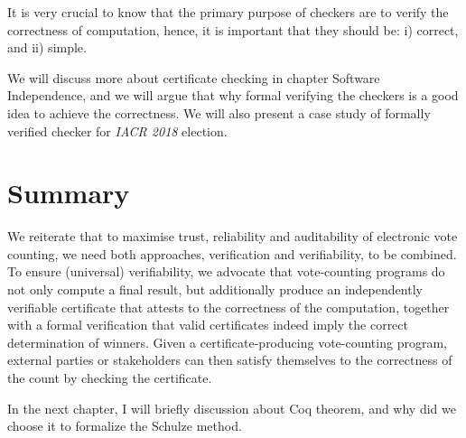    

  
  It is very crucial to know that the primary purpose of checkers are to verify the 
  correctness of computation, hence, it is important that they 
  should be: i) correct, and ii) simple.  
  
  We will discuss more about certificate checking 
  in chapter Software Independence,  and we will argue that why formal verifying the checkers is 
  a good idea to achieve the correctness.  We will also present a case study of 
  formally verified checker for \textit{IACR 2018} election.
  
  
    
   
\section{Summary}
We reiterate that to maximise trust, reliability and auditability of electronic vote counting, we
need both approaches, verification and verifiability, to be combined. To ensure
(universal) verifiability, we advocate that vote-counting programs
do not only compute a final result, but additionally produce an
independently verifiable certificate that attests to the correctness
of the computation, together with a formal verification that
valid certificates indeed imply the correct determination of
winners. Given a certificate-producing vote-counting program, external
parties or stakeholders can then satisfy themselves to the
correctness of the count by checking the certificate.    

In the next chapter, I will  briefly discussion about Coq theorem, and why did we choose it 
to formalize the Schulze method.